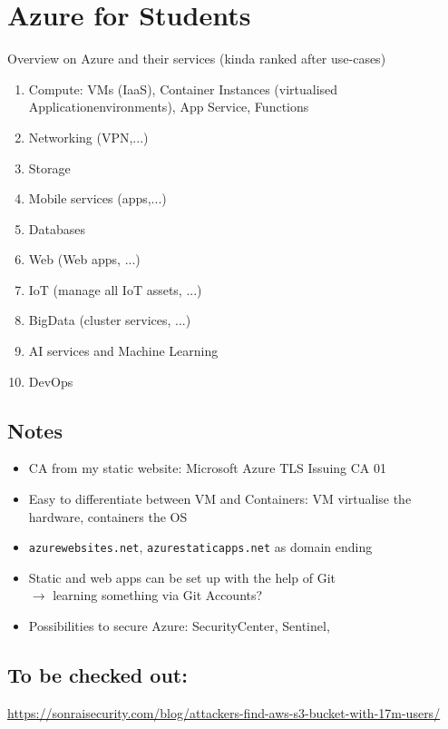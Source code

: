 \documentclass[12pt]{article}
\begin{document}
\thispagestyle{firstpage}

\section*{Azure for Students}
Overview on Azure and their services (kinda ranked after use-cases)
\begin{enumerate}
    \item Compute: VMs (IaaS), Container Instances (virtualised Applicationenvironments), App Service, Functions
    \item Networking (VPN,...)
    \item Storage
    \item Mobile services (apps,...)
    \item Databases
    \item Web (Web apps, ...)
    \item IoT (manage all IoT assets, ...)
    \item BigData (cluster services, ...)
    \item AI services and Machine Learning
    \item DevOps
\end{enumerate}


\subsection*{Notes}
\begin{itemize}
    \item CA from my static website: Microsoft Azure TLS Issuing CA 01
    \item Easy to differentiate between VM and Containers: VM virtualise the hardware, containers the OS
    \item \verb|azurewebsites.net|, \verb|azurestaticapps.net| as domain ending
    \item Static and web apps can be set up with the help of Git \\ 
    $\rightarrow$ learning something via Git Accounts?
    \item Possibilities to secure Azure: SecurityCenter, Sentinel, 
\end{itemize}

\subsection*{To be checked out:}
\url{https://sonraisecurity.com/blog/attackers-find-aws-s3-bucket-with-17m-users/} \\ \\
\end{document}
